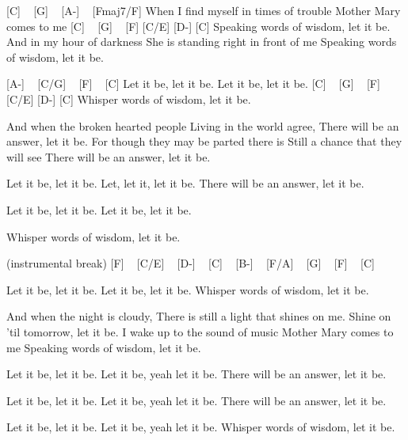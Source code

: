 [C] ~ [G] ~ [A-] ~ [Fmaj7/F]
 When I find myself in times of trouble
Mother Mary comes to me
[C] ~ [G] ~ [F] [C/E] [D-] [C]
Speaking words of wisdom, let it be.
And in my hour of darkness
She is standing right in front of me
Speaking words of wisdom, let it be.

[A-] ~ [C/G] ~ [F] ~ [C]
Let it be, let it be.
Let it be, let it be.
[C] ~ [G] ~ [F] [C/E] [D-] [C]
Whisper words of wisdom, let it be.

And when the broken hearted people
Living in the world agree,
There will be an answer, let it be.
For though they may be parted there is
Still a chance that they will see
There will be an answer, let it be.

Let it be, let it be.
Let, let it, let it be.
There will be an answer, let it be.

Let it be, let it be.
Let it be, let it be.

Whisper words of wisdom, let it be.


(instrumental break)
[F] ~ [C/E] ~ [D-] ~ [C] ~ [B-] ~ [F/A] ~ [G] ~ [F] ~ [C]


Let it be, let it be.
Let it be, let it be.
Whisper words of wisdom, let it be.

And when the night is cloudy,
There is still a light that shines on me.
Shine on 'til tomorrow, let it be.
I wake up to the sound of music
Mother Mary comes to me
Speaking words of wisdom, let it be.

Let it be, let it be.
Let it be, yeah let it be.
There will be an answer, let it be.


Let it be, let it be.
Let it be, yeah let it be.
There will be an answer, let it be.

Let it be, let it be.
Let it be, yeah let it be.
Whisper words of wisdom, let it be.

